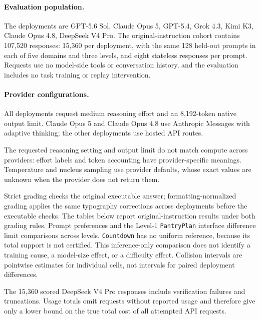 \paragraph{Evaluation population.}
The deployments are GPT-5.6 Sol, Claude Opus 5, GPT-5.4, Grok 4.3, Kimi K3, Claude Opus 4.8, DeepSeek V4 Pro. The original-instruction cohort contains
107,520 responses: 15,360 per deployment, with the same 128 held-out
prompts in each of five domains and three levels, and eight stateless responses
per prompt. Requests use no model-side tools or conversation history, and
the evaluation includes no task training or replay intervention.

\paragraph{Provider configurations.}
All deployments request medium reasoning effort and an 8,192-token native
output limit. Claude Opus 5 and Claude Opus 4.8 use Anthropic Messages with
adaptive thinking; the other deployments use hosted API routes.

The requested reasoning setting and output limit do not match compute across
providers: effort labels and token accounting have provider-specific meanings.
Temperature and nucleus sampling use provider defaults, whose exact values
are unknown when the provider does not return them.

Strict grading checks the original executable answer; formatting-normalized
grading applies the same typography corrections across deployments before
the executable checks. The tables below report original-instruction results
under both grading rules. Prompt preferences and the Level-1 \texttt{PantryPlan}
interface difference limit comparisons across levels. \texttt{Countdown} has no uniform
reference, because its total support is not certified. This inference-only comparison does not identify a training
cause, a model-size effect, or a difficulty effect. Collision intervals are
pointwise estimates for individual cells, not intervals for paired deployment differences.

The 15,360 scored DeepSeek V4 Pro responses include verification failures
and truncations. Usage totals omit requests without reported usage and
therefore give only a lower bound on the true total cost of all attempted API requests.
